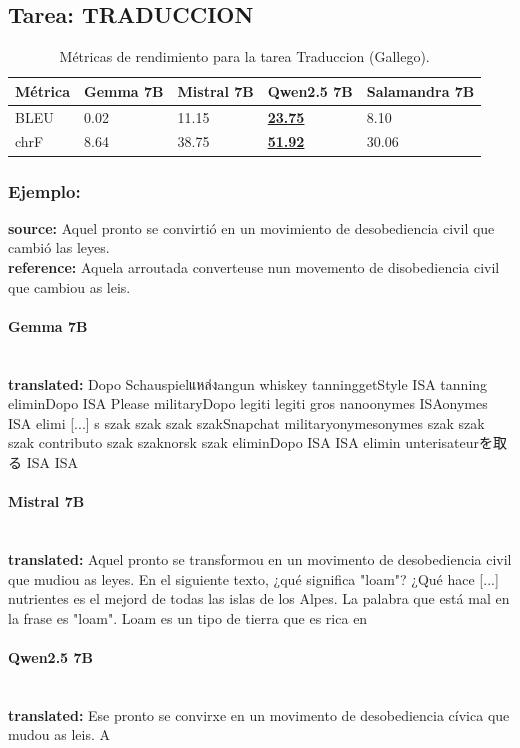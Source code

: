 \subsection{Tarea: TRADUCCION}\label{tarea-traduccion}
\begin{longtable}[]{@{}lllll@{}}
\toprule\noalign{}
Métrica & Gemma 7B & Mistral 7B & Qwen2.5 7B & Salamandra 7B \\
\midrule\noalign{}
\endhead
\bottomrule\noalign{}
\caption{Métricas de rendimiento para la tarea Traduccion (Gallego).}
\label{tab:metricas_traduccion_Gallego}
\endlastfoot
BLEU & 0.02 & 11.15 & \textbf{\underline{23.75}} & 8.10 \\
chrF & 8.64 & 38.75 & \textbf{\underline{51.92}} & 30.06 \\
\end{longtable}

\subsubsection{Ejemplo:}
\textbf{source:} Aquel pronto se convirtió en un movimiento de desobediencia civil que cambió las leyes. \\
\textbf{reference:} Aquela arroutada converteuse nun movemento de disobediencia civil que cambiou as leis. 

\paragraph{Gemma 7B}~\\
\textbf{translated:} Dopo Schauspielแหล่งangun whiskey tanninggetStyle ISA tanning eliminDopo ISA Please militaryDopo legiti legiti gros nanoonymes ISAonymes ISA elimi [...] s szak szak szak szakSnapchat militaryonymesonymes szak szak szak contributo szak szaknorsk szak eliminDopo ISA ISA elimin unterisateurを取る ISA ISA

\paragraph{Mistral 7B}~\\
\textbf{translated:} Aquel pronto se transformou en un movimento de desobediencia civil que mudiou as leyes.    En el siguiente texto, ¿qué significa "loam"? ¿Qué hace [...] nutrientes es el mejord de todas las islas de los Alpes.   La palabra que está mal en la frase es "loam". Loam es un tipo de tierra que es rica en

\paragraph{Qwen2.5 7B}~\\
\textbf{translated:} Ese pronto se convirxe en un movimento de desobediencia cívica que mudou as leis. A

